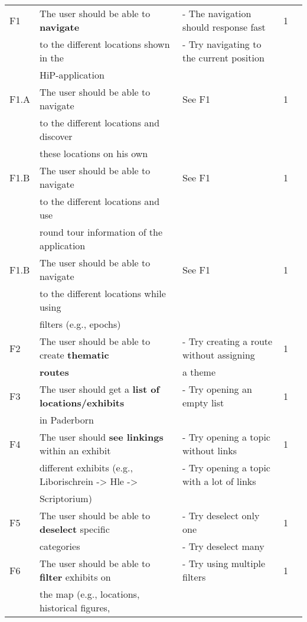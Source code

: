 {\begin{landscape}
\begin{center}
\begin{longtable}{|l|l|lll|}
\hline \hline
\endlastfoot
		\hline
F1 & The user should be able to \textbf{navigate} 			&  - The navigation should response fast  		& 1\\
	 	& to the different locations shown in the 				&  - Try navigating to the current position		& \\
		& HiP-application 								&		&	\\
	\hline
	F1.A & The user should be able to navigate 				&  See F1		& 1\\
	 	& to the different locations and discover 				&  		& \\
		& these locations on his own 						&		&	\\
	\hline
	F1.B & The user should be able to navigate 				&  See F1		& 1\\
	 	& to the different locations and use 				&  		& \\
		& round tour information of the application 			&		&	\\
		\hline
	F1.B & The user should be able to navigate 				& See F1	 	& 1\\
	 	& to the different locations while using  				&  		& \\
		& filters (e.g., epochs)							&		&	\\
	\hline
	F2 & The user should be able to create \textbf{thematic} 	& - Try creating a route without assigning & 1\\
		& \textbf{routes} 								& a theme & \\
	\hline
	F3 & The user should get a \textbf{list of locations/exhibits} 	& - Try opening an empty list  	& 1\\
		& in Paderborn									&	& \\
	\hline
	F4 & The user should \textbf{see linkings} within an exhibit  	&  - Try opening a topic without links	& 1\\
		& different exhibits (e.g., Liborischrein -> Hle ->		& - Try opening a topic with a lot of links	& \\
		& Scriptorium) 									&	& \\
	\hline
	F5 & The user should be able to \textbf{deselect} specific 	& - Try deselect only one & 1\\
		& categories 									& - Try deselect many	& \\
	\hline
	F6 & The user should be able to \textbf{filter} exhibits on  	& - Try using multiple filters  	& 1\\
		& the map (e.g., locations, historical figures, 			&	& \\

\end{longtable}
\end{center}
\end{landscape}}
